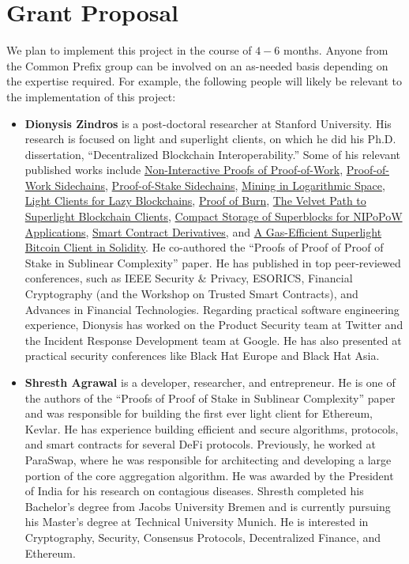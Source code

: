 \section{Grant Proposal}

We plan to implement this project in the course of $4-6$ months. Anyone from the Common Prefix group
can be involved on an as-needed basis depending on the expertise required. For example, the following
people will likely be relevant to the implementation of this project:

\begin{itemize}
    \item \textbf{Dionysis Zindros} is a post-doctoral researcher at Stanford University. His research is focused on light and superlight clients, on which he did his Ph.D. dissertation, “Decentralized Blockchain Interoperability.” Some of his relevant published works include \href{https://eprint.iacr.org/2017/963.pdf}{Non-Interactive Proofs of Proof-of-Work}, \href{https://eprint.iacr.org/2018/1048.pdf}{Proof-of-Work Sidechains}, \href{https://eprint.iacr.org/2018/1048.pdf}{Proof-of-Stake
      Sidechains}, \href{https://eprint.iacr.org/2021/623.pdf}{Mining in Logarithmic Space}, \href{https://arxiv.org/abs/2203.15968}{Light Clients for Lazy Blockchains}, \href{https://eprint.iacr.org/2019/1096.pdf}{Proof of Burn}, \href{https://eprint.iacr.org/2020/1122.pdf}{The Velvet Path to Superlight Blockchain Clients}, \href{https://eprint.iacr.org/2019/1444.pdf}{Compact Storage of Superblocks for NIPoPoW Applications}, \href{https://eprint.iacr.org/2020/138.pdf}{Smart Contract Derivatives}, and
      \href{https://eprint.iacr.org/2020/927}{A Gas-Efficient Superlight Bitcoin Client in Solidity}. He co-authored the “Proofs of Proof of Proof of Stake in Sublinear Complexity” paper. He has published in top peer-reviewed conferences, such as IEEE Security \& Privacy, ESORICS, Financial Cryptography (and the Workshop on Trusted Smart Contracts), and Advances in Financial Technologies. Regarding practical software engineering experience, Dionysis has worked on the Product Security team at Twitter and the Incident Response Development team at Google. He has also presented at practical security conferences like Black Hat Europe and Black Hat Asia. 
  \item \textbf{Shresth Agrawal} is a developer, researcher, and entrepreneur. He is one of the authors of the “Proofs of Proof of Stake in Sublinear Complexity” paper and was responsible for building the first ever light client for Ethereum, Kevlar. He has experience building efficient and secure algorithms, protocols, and smart contracts for several DeFi protocols. Previously, he worked at ParaSwap, where he was responsible for architecting and developing a large portion of the core aggregation algorithm. He was awarded by the President of India for his research on contagious diseases. Shresth completed his Bachelor’s degree from Jacobs University Bremen and is currently pursuing his Master’s degree at Technical University Munich. He is interested in Cryptography, Security, Consensus Protocols, Decentralized Finance, and Ethereum.

\end{itemize}
